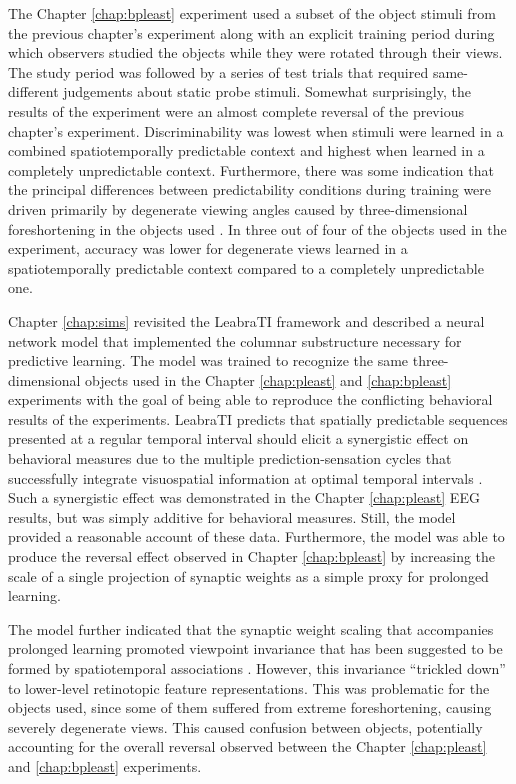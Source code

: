 \documentclass[dwyatte_dissertation.tex]{subfiles}
\begin{document}
The Chapter \ref{chap:bpleast} experiment used a subset of the object stimuli from the previous chapter's experiment along with an explicit training period during which observers studied the objects while they were rotated through their views. The study period was followed by a series of test trials that required same-different judgements about static probe stimuli. Somewhat surprisingly, the results of the experiment were an almost complete reversal of the previous chapter's experiment. Discriminability was lowest when stimuli were learned in a combined spatiotemporally predictable context and highest when learned in a completely unpredictable context. Furthermore, there was some indication that the principal differences between predictability conditions during training were driven primarily by degenerate viewing angles caused by three-dimensional foreshortening in the objects used \cite{BalasSinha09b}. In three out of four of the objects used in the experiment, accuracy was lower for degenerate views learned in a spatiotemporally predictable context compared to a completely unpredictable one.

Chapter \ref{chap:sims} revisited the LeabraTI framework and described a neural network model that implemented the columnar substructure necessary for predictive learning. The model was trained to recognize the same three-dimensional objects used in the Chapter \ref{chap:pleast} and \ref{chap:bpleast} experiments with the goal of being able to reproduce the conflicting behavioral results of the experiments. LeabraTI predicts that spatially predictable sequences presented at a regular temporal interval should elicit a synergistic effect on behavioral measures due to the multiple prediction-sensation cycles that successfully integrate visuospatial information at optimal temporal intervals \cite[see also]{DohertyRaoMesulamEtAl05,RohenkohlGouldPessoaEtAl14}. Such a synergistic effect was demonstrated in the Chapter \ref{chap:pleast} EEG results, but was simply additive for behavioral measures. Still, the model provided a reasonable account of these data. Furthermore, the model was able to produce the reversal effect observed in Chapter \ref{chap:bpleast} by increasing the scale of a single projection of synaptic weights as a simple proxy for prolonged learning. 

The model further indicated that the synaptic weight scaling that accompanies prolonged learning promoted viewpoint invariance that has been suggested to be formed by spatiotemporal associations \cite{StringerPerryRollsEtAl06,WallisBaddeley97,IsikLeiboPoggio12,WallisBulthoff01,WallisBackusLangerEtAl09}. However, this invariance ``trickled down'' to lower-level retinotopic feature representations. This was problematic for the objects used, since some of them suffered from extreme foreshortening, causing severely degenerate views. This caused confusion between objects, potentially accounting for the overall reversal observed between the Chapter \ref{chap:pleast} and \ref{chap:bpleast} experiments.
\end{document}
